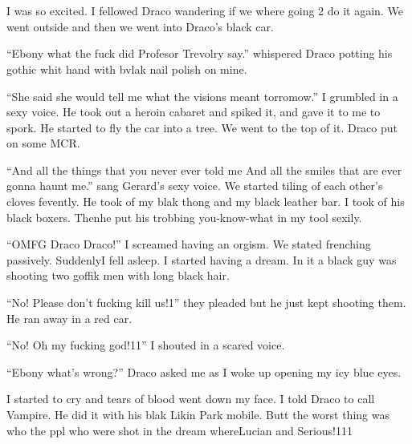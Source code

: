 \section{\chaptername~\thesection}



I was so excited. I fellowed Draco wandering if we where going 2 do it again. We went outside and then we went into Draco's black car.

\enquote{Ebony what the fuck did Profesor Trevolry say.} whispered Draco potting his gothic whit hand with bvlak nail polish on mine.

\enquote{She said she would tell me what the visions meant torromow.} I grumbled in a sexy voice. He took out a heroin cabaret and spiked it, and gave it to me to spork. He started to fly the car into a tree. We went to the top of it. Draco put on some MCR.

\enquote{And all the things that you never ever told me
And all the smiles that are ever gonna haunt me.} sang Gerard's sexy voice. We started tiling of each other's cloves fevently. He took of my blak thong and my black leather bar. I took of his black boxers. Then\dotfill\newline he put his trobbing you-know-what in my tool sexily.

\enquote{OMFG Draco Draco!} I screamed having an orgism. We stated frenching passively. Suddenly\dotfill I fell asleep.\newline
I started having a dream. In it a black guy was shooting two goffik men with long black hair.

\enquote{No! Please don't fucking kill us!1} they pleaded but he just kept shooting them. He ran away in a red car.

\enquote{No! Oh my fucking god!11} I shouted in a scared voice.

\enquote{Ebony what's wrong?} Draco asked me as I woke up opening my icy blue eyes.

I started to cry and tears of blood went down my face. I told Draco to call Vampire. He did it with his blak Likin Park mobile. Butt the worst thing was who the ppl who were shot in the dream where\dotfill Lucian and Serious!111

